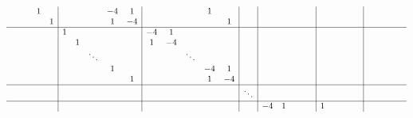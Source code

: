 \documentclass[10pt, oneside, letterpaper]{article}
\begin{document}
\begin{align*}
{\begin{array}{c c c c c | c c c c c | c c c c c | c | c c c c c | c c c c c | c c c c c}
        &        &        &    1   &        &        &        &        &   -4   &    1   &        &        &        &    1   &        &        &        &        &        &        &        &        &        &        &        &        &        &        &        &        &        \\
        &        &        &        &    1   &        &        &        &    1   &   -4   &        &        &        &        &    1   &        &        &        &        &        &        &        &        &        &        &        &        &        &        &        &        \\
\hline
        &        &        &        &        &    1   &        &        &        &        &   -4   &    1   &        &        &        &        &        &        &        &        &        &        &        &        &        &        &        &        &        &        &        \\
        &        &        &        &        &        &    1   &        &        &        &    1   &   -4   &        &        &        &        &        &        &        &        &        &        &        &        &        &        &        &        &        &        &        \\
        &        &        &        &        &        &        & \ddots &        &        &        &        & \ddots &        &        &        &        &        &        &        &        &        &        &        &        &        &        &        &        &        &        \\
        &        &        &        &        &        &        &        &    1   &        &        &        &        &   -4   &    1   &        &        &        &        &        &        &        &        &        &        &        &        &        &        &        &        \\
        &        &        &        &        &        &        &        &        &    1   &        &        &        &    1   &   -4   &        &        &        &        &        &        &        &        &        &        &        &        &        &        &        &        \\
\hline
        &        &        &        &        &        &        &        &        &        &        &        &        &        &        & \ddots &        &        &        &        &        &        &        &        &        &        &        &        &        &        &        \\
\hline
        &        &        &        &        &        &        &        &        &        &        &        &        &        &        &        &   -4   &    1   &        &        &        &    1   &        &        &        &        &        &        &        &        &        \\

\end{array}}
\end{align*}
\end{document}
